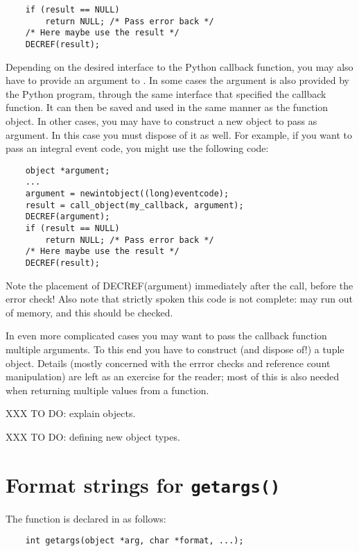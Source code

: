 \begin{verbatim}
    if (result == NULL)
        return NULL; /* Pass error back */
    /* Here maybe use the result */
    DECREF(result); 
\end{verbatim}

Depending on the desired interface to the Python callback function,
you may also have to provide an argument to .  In
some cases the argument is also provided by the Python program,
through the same interface that specified the callback function.  It
can then be saved and used in the same manner as the function object.
In other cases, you may have to construct a new object to pass as
argument.  In this case you must dispose of it as well.  For example,
if you want to pass an integral event code, you might use the
following code:

\begin{verbatim}
    object *argument;
    ...
    argument = newintobject((long)eventcode);
    result = call_object(my_callback, argument);
    DECREF(argument);
    if (result == NULL)
        return NULL; /* Pass error back */
    /* Here maybe use the result */
    DECREF(result);
\end{verbatim}

Note the placement of DECREF(argument) immediately after the call,
before the error check!  Also note that strictly spoken this code is
not complete:  may run out of memory, and this
should be checked.

In even more complicated cases you may want to pass the callback
function multiple arguments.  To this end you have to construct (and
dispose of!) a tuple object.  Details (mostly concerned with the
errror checks and reference count manipulation) are left as an
exercise for the reader; most of this is also needed when returning
multiple values from a function.

XXX TO DO: explain objects.

XXX TO DO: defining new object types.


\section{Format strings for {\tt getargs()}}

The  function is declared in  as
follows:

\begin{verbatim}
    int getargs(object *arg, char *format, ...);
\end{verbatim}

